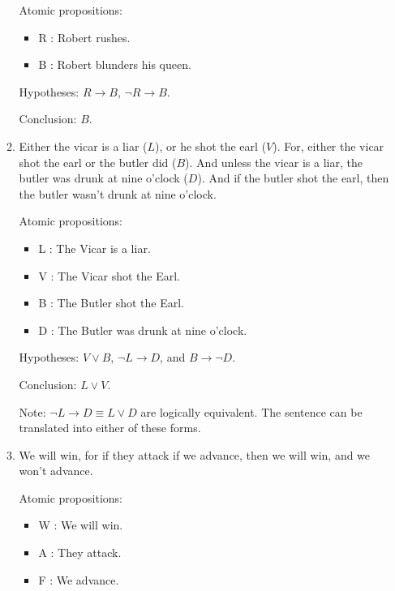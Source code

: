 \documentclass[11pt]{report}
\begin{document}
\begin{enumerate}
\begin{enumerate}
		\hspace{0.2cm}{\bf Solution}

		Atomic propositions: 

		\begin{itemize}
			\item[] R : Robert rushes.
			\item[] B : Robert blunders his queen. 
		\end{itemize}
	
		Hypotheses: $R \to B$, $\lnot R \to B$. 
	
		Conclusion: $B$.
		
		\item Either the vicar is a liar ($L$), or he shot the earl ($V$). For, either the vicar shot the earl or the butler did ($B$). And unless the vicar is a liar, the butler was drunk at nine o'clock ($D$). And if the butler shot the earl, then the butler wasn't drunk at nine o'clock.
		
		\hspace{0.2cm}{\bf Solution}

		Atomic propositions: 

		\begin{itemize}
			\item[] L : The Vicar is a liar.
			\item[] V : The Vicar shot the Earl. 
			\item[] B : The Butler shot the Earl. 
			\item[] D : The Butler was drunk at nine o'clock.
		\end{itemize}
	
		Hypotheses: $V \lor B$, $\lnot L \to D$, and $B \to \lnot D$. 
	
		Conclusion: $L \lor V$.

		Note: $\lnot L \to D \equiv L \lor D$ are logically equivalent. The sentence can be translated into either of these forms. 

		\item We will win, for if they attack if we advance, then we will win, and we won't advance. 
		
		\hspace{0.2cm}{\bf Solution}

		Atomic propositions: 

		\begin{itemize}
			\item[] W : We will win.
			\item[] A : They attack. 
			\item[] F : We advance.
		\end{itemize}
	

\end{enumerate}
\end{enumerate}
\end{document}
